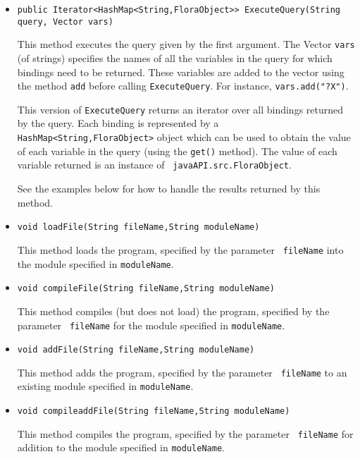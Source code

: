 \begin{itemize}
\item
\begin{verbatim}
public Iterator<HashMap<String,FloraObject>> ExecuteQuery(String query, Vector vars)
\end{verbatim}
  This method executes the \FLORA query given by the first argument. The
  Vector {\tt vars} (of strings) specifies the names of all the variables
  in the query for which bindings need to be returned. These variables are
  added to the vector using the method {\tt add} before calling
  {\tt ExecuteQuery}. For instance, {\tt vars.add("?X")}.  
  
  This version of {\tt ExecuteQuery} returns an iterator over all bindings
  returned by the \FLORA query.  Each binding is represented by a {\tt
    HashMap<String,FloraObject>} 
  object which can be used to obtain the value of each variable in the
  query (using the {\tt get()} method). The value of each variable returned
  is an instance of {\tt
    javaAPI.src.FloraObject}.

  See the examples below for how to handle the results
  returned by this method.

\item
\begin{verbatim}
void loadFile(String fileName,String moduleName)
\end{verbatim}
  This method loads the \FLORA program, specified by the parameter {\tt
    fileName} into the \FLORA module specified in {\tt moduleName}.
\item
\begin{verbatim}
void compileFile(String fileName,String moduleName)
\end{verbatim}
  This method compiles (but does not load)
  the \FLORA program, specified by the parameter {\tt
    fileName} for the \FLORA module specified in {\tt moduleName}.
\item
\begin{verbatim}
void addFile(String fileName,String moduleName)
\end{verbatim}
  This method adds the \FLORA program, specified by the parameter {\tt
    fileName} to an existing \FLORA module specified in {\tt moduleName}.
\item
\begin{verbatim}
void compileaddFile(String fileName,String moduleName)
\end{verbatim}
  This method compiles the \FLORA program, specified by the parameter {\tt
    fileName} for addition to the \FLORA module specified in {\tt moduleName}.
\end{itemize}

